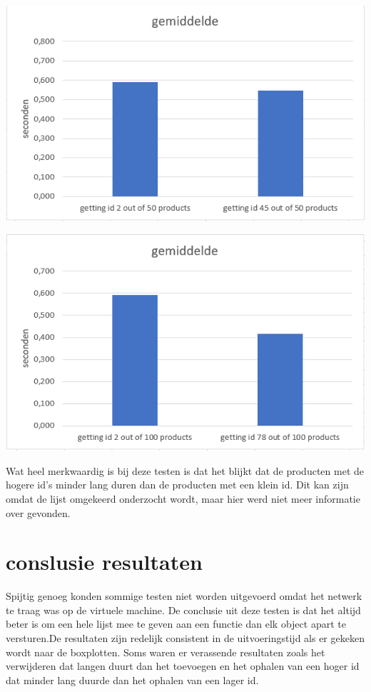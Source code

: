 \documentclass[fleqn,a4paper,12pt]{book}
\begin{document}
\begin{enumerate}
		\begin{center}
			\includegraphics[width=14cm]{img/test-column-4}\\[1cm]
		\end{center}
		\begin{center}
			\includegraphics[width=14cm]{img/test-column-5}\\[1cm]
		\end{center}
		Wat heel merkwaardig is bij deze testen is dat het blijkt dat de producten met de hogere id's minder lang duren dan de producten met een klein id. Dit kan zijn omdat de lijst omgekeerd onderzocht wordt, maar hier werd niet meer informatie over gevonden.
\end{enumerate}
\section{conslusie resultaten}
Spijtig genoeg konden sommige testen niet worden uitgevoerd omdat het netwerk te traag was op de virtuele machine. De conclusie uit deze testen is dat het altijd beter is om een hele lijst mee te geven aan een functie dan elk object apart te versturen.De resultaten zijn redelijk consistent in de uitvoeringstijd als er gekeken wordt naar de boxplotten. Soms waren er verassende resultaten zoals het verwijderen dat langen duurt dan het toevoegen en het ophalen van een hoger id dat minder lang duurde dan het ophalen van een lager id.
\end{document}
